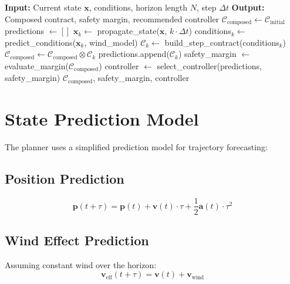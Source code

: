 \begin{algorithm}[H]
\caption{Horizon Contract Composition}
\begin{algorithmic}[1]
    \State \textbf{Input:} Current state $\mathbf{x}$, conditions, horizon length $N$, step $\Delta t$
    \State \textbf{Output:} Composed contract, safety margin, recommended controller
    \State
    \State $\mathcal{C}_{\text{composed}} \gets \mathcal{C}_{\text{initial}}$
    \State predictions $\gets []$
        \State $\mathbf{x}_k \gets$ propagate\_state($\mathbf{x}$, $k \cdot \Delta t$)
        \State conditions$_k \gets$ predict\_conditions($\mathbf{x}_k$, wind\_model)
        \State $\mathcal{C}_k \gets$ build\_step\_contract(conditions$_k$)
        \State $\mathcal{C}_{\text{composed}} \gets \mathcal{C}_{\text{composed}} \otimes \mathcal{C}_k$
        \State predictions.append($\mathcal{C}_k$)
    \EndFor
    \State
    \State safety\_margin $\gets$ evaluate\_margin($\mathcal{C}_{\text{composed}}$)
    \State controller $\gets$ select\_controller(predictions, safety\_margin)
    \State \Return $\mathcal{C}_{\text{composed}}$, safety\_margin, controller
\end{algorithmic}
\end{algorithm}

\section{State Prediction Model}

The planner uses a simplified prediction model for trajectory forecasting:

\subsection{Position Prediction}

\begin{equation}
    \mathbf{p}(t + \tau) = \mathbf{p}(t) + \mathbf{v}(t) \cdot \tau + \frac{1}{2}\mathbf{a}(t) \cdot \tau^2
\end{equation}

\subsection{Wind Effect Prediction}

Assuming constant wind over the horizon:
\begin{equation}
    \mathbf{v}_{\text{eff}}(t + \tau) = \mathbf{v}(t) + \mathbf{v}_{\text{wind}}
\end{equation}

